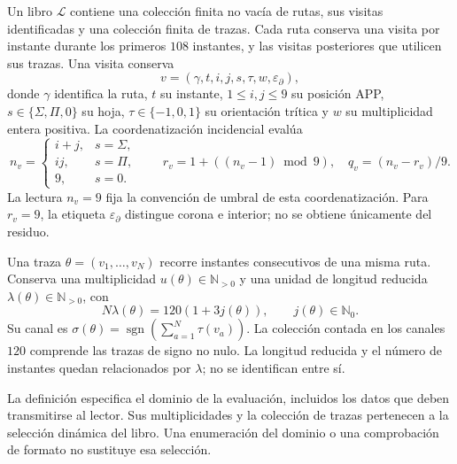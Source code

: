 \begin{definition}
\label{vi:dep:libro-dominio}
Un libro \(\mathscr L\) contiene una colección finita no vacía de rutas,
sus visitas identificadas y una colección finita de trazas. Cada ruta
conserva una visita por instante durante los primeros \(108\) instantes,
y las visitas posteriores que utilicen sus trazas. Una visita conserva
\[
 v=(\gamma,t,i,j,s,\tau,w,\varepsilon_\partial),
\]
donde \(\gamma\) identifica la ruta, \(t\) su instante, \(1\le i,j\le9\)
su posición APP, \(s\in\{\Sigma,\Pi,0\}\) su hoja,
\(\tau\in\{-1,0,1\}\) su orientación trítica y \(w\) su multiplicidad
entera positiva. La coordenatización incidencial evalúa
\[
 n_v=
 \begin{cases}
 i+j,&s=\Sigma,\\
 ij,&s=\Pi,\\
 9,&s=0.
 \end{cases}
 \qquad
 r_v=1+((n_v-1)\bmod9),\quad q_v=(n_v-r_v)/9.
\]
La lectura \(n_v=9\) fija la convención de umbral de esta coordenatización.
Para \(r_v=9\), la etiqueta \(\varepsilon_\partial\) distingue
corona e interior; no se obtiene únicamente del residuo.

Una traza \(\theta=(v_1,\ldots,v_N)\) recorre instantes consecutivos de
una misma ruta. Conserva una multiplicidad \(u(\theta)\in\mathbb N_{>0}\)
y una unidad de longitud reducida
\(\lambda(\theta)\in\mathbb N_{>0}\), con
\[
 N\lambda(\theta)=120(1+3j(\theta)),\qquad j(\theta)\in\mathbb N_0.
\]
Su canal es
\(\sigma(\theta)=\operatorname{sgn}(\sum_{a=1}^N\tau(v_a))\).
La colección contada en los canales \(120\) comprende las trazas de
signo no nulo. La longitud reducida y el número de instantes quedan
relacionados por \(\lambda\); no se identifican entre sí.
\end{definition}

La definición especifica el dominio de la evaluación, incluidos los
datos que deben transmitirse al lector. Sus multiplicidades y la colección
de trazas pertenecen a la selección dinámica del libro. Una enumeración
del dominio o una comprobación de formato no sustituye esa selección.

